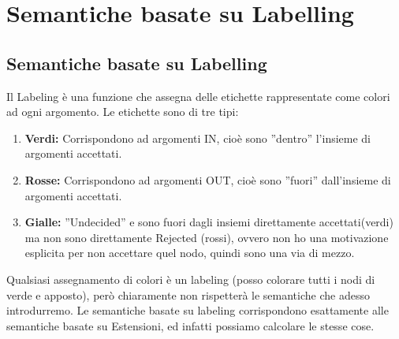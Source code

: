     \chapter{Semantiche basate su Labelling} \label{ch:Semantiche basate su
        Labelling}
    \section{Semantiche basate su Labelling}
    Il Labeling è una funzione che assegna delle etichette rappresentate come
    colori ad ogni argomento. Le etichette sono di tre tipi:
    \begin{enumerate}
        \item \textbf{Verdi:} Corrispondono ad argomenti IN, cioè sono ”dentro”
              l'insieme di argomenti accettati.
        \item \textbf{Rosse:} Corrispondono ad argomenti OUT, cioè sono ”fuori”
              dall'insieme di argomenti accettati.
        \item \textbf{Gialle:} ”Undecided” e sono fuori dagli insiemi
              direttamente accettati(verdi) ma non sono direttamente Rejected (rossi),
              ovvero non ho una motivazione esplicita per non accettare quel nodo,
              quindi sono una via di mezzo.
    \end{enumerate}
    Qualsiasi assegnamento di colori è un labeling (posso colorare tutti i nodi
    di verde e apposto), però chiaramente non rispetterà le semantiche che
    adesso introdurremo. Le semantiche basate su labeling corrispondono
    esattamente alle semantiche basate su Estensioni, ed infatti possiamo
    calcolare le stesse cose.

